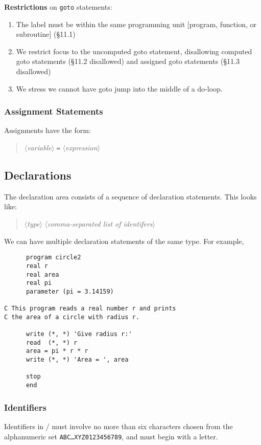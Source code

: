 \textbf{Restrictions} on \texttt{goto} statements:
\begin{enumerate}
\item The label must be within the same programming unit [program,
  function, or subroutine] (\S11.1)
\item We restrict focus to the uncomputed goto statement, disallowing
  computed goto statements (\S11.2 disallowed) and assigned goto
  statements (\S11.3 disallowed)
\item We stress we cannot have goto jump into the middle of a do-loop.
\end{enumerate}

\subsubsection{Assignment Statements}
Assignments have the form:
\begin{quote}
$\langle$\textit{variable\/}$\rangle$ \texttt{=} $\langle$\textit{expression\/}$\rangle$
\end{quote}

\subsection{Declarations}
The declaration area consists of a sequence of declaration
statements. This looks like:
\begin{quote}
$\langle$\textit{type\/}$\rangle$ $\langle$\textit{comma-separated list of identifers\/}$\rangle$
\end{quote}
We can have multiple declaration statements of the same type. For
example,
\begin{lstlisting}
      program circle2
      real r
      real area
      real pi
      parameter (pi = 3.14159)

C This program reads a real number r and prints
C the area of a circle with radius r.

      write (*, *) 'Give radius r:'
      read  (*, *) r
      area = pi * r * r
      write (*, *) 'Area = ', area

      stop
      end
\end{lstlisting}
\subsubsection{Identifiers}
Identifiers in \FORTRAN/ must involve no more than six characters chosen
from the alphanumeric set \texttt{ABC\dots XYZ0123456789}, and must
begin with a letter.

